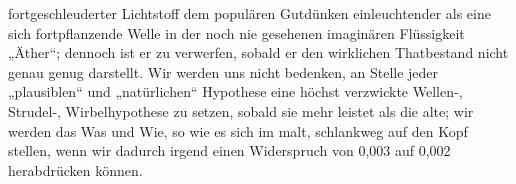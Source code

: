fortgeschleuderter Lichtstoff dem populären Gutdünken einleuchtender als eine sich fortpflanzende Welle in der noch nie gesehenen imaginären Flüssigkeit „Äther“; dennoch ist er zu verwerfen, sobald er den wirklichen Thatbestand nicht genau genug darstellt. Wir werden uns nicht bedenken, an Stelle jeder „plausiblen“ und „natürlichen“ Hypothese eine höchst verzwickte Wellen-, Strudel-, Wirbelhypothese zu setzen, sobald sie  mehr leistet als die alte; wir werden das Was und Wie, so wie es sich im  malt, schlankweg auf den Kopf stellen, wenn wir dadurch irgend einen Widerspruch von 0,003 auf 0,002 herabdrücken können.
\par

